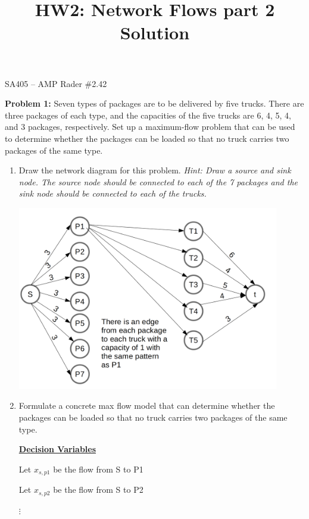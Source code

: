 \documentclass[11pt]{article}
\makeatletter
\theoremstyle{definition}
\newcommand{\blu}{\color{blue}}
\renewcommand{\maketitle}{
  \noindent SA405 -- AMP \hfill Rader \#2.42 \\

  \begin{center}\Large{\textbf{\@title}}\end{center}
}
\makeatother
\begin{document}
  
\title{HW2: Network Flows part 2 Solution}


\maketitle

\textbf{Problem 1:} Seven types of packages are to be delivered by five trucks. There are three packages of each type, and the capacities of the five trucks are 6, 4, 5, 4, and 3 packages, respectively. Set up a maximum-flow problem that can be used to determine whether the packages can be loaded so that no truck carries two packages of the same type. 

\begin{enumerate}
\item Draw the network diagram for this problem. \emph{Hint: Draw a source and sink node. The source node should be connected to each of the 7 packages and the sink node should be connected to each of the trucks.}

\begin{center}
\includegraphics[width=0.9\textwidth]{Prob1.png}
\end{center}

\newpage

\item Formulate a concrete max flow model that can determine whether the packages can be loaded so that no truck carries two packages of the same type.

{\blu
\textbf{\underline{Decision Variables}}

Let $x_{s,p1}$ be the flow from S to P1

Let $x_{s,p2}$ be the flow from S to P2

$\vdots$

}
\end{enumerate}
\end{document}
